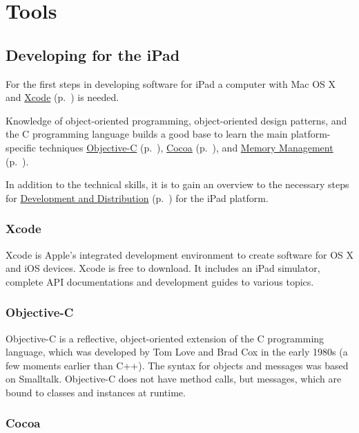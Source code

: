 

\section{Tools}

\subsection{Developing for the iPad}

For the first steps in developing software for iPad
a computer with Mac OS X and \href{sec:Xcode}{Xcode} (p.~\pageref{sec:Xcode}) is needed. 

Knowledge of object-oriented programming, object-oriented design patterns, and the C programming language 
builds a good base to learn the main platform-specific techniques 
\href{sec:ObjC}{Objective-C} (p.~\pageref{sec:ObjC}),
\href{sec:Cocoa}{Cocoa} (p.~\pageref{sec:Cocoa}), and
\href{sec:MemoryManagement}{Memory Management} (p.~\pageref{sec:MemoryManagement}).

In addition to the technical skills, it is to gain an overview to the necessary steps for 
\href{sec:DAD}{Development and Distribution} (p.~\pageref{sec:DAD}) for the iPad platform.

\subsubsection{Xcode}
\label{sec:Xcode}

Xcode is Apple's integrated development environment to create software for OS X and iOS devices.
Xcode is free to download. It includes an iPad simulator, complete API documentations and development guides to various topics.

\subsubsection{Objective-C}
\label{sec:ObjC}
Objective-C is a reflective, object-oriented extension of the C programming language,
 which was developed by Tom Love and Brad Cox in the early 1980s (a few moments earlier than C++). 
The syntax for objects and messages was based on Smalltalk. 
Objective-C does not have method calls, but messages, which are bound to classes and instances at runtime.

\subsubsection{Cocoa}
\label{sec:Cocoa}


